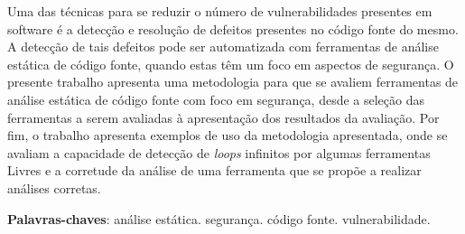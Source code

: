 \begin{resumo}

Uma das técnicas para se reduzir o número de vulnerabilidades presentes em
software é a detecção e resolução de defeitos presentes no código fonte
do mesmo. A detecção de tais defeitos pode ser automatizada com ferramentas de
análise estática de código fonte, quando estas têm um foco em aspectos de
segurança. O presente trabalho apresenta uma metodologia para que se avaliem
ferramentas de análise estática de código fonte com foco em segurança, desde a
seleção das ferramentas a serem avaliadas à apresentação dos resultados da
avaliação. Por fim, o trabalho apresenta exemplos de uso da metodologia
apresentada, onde se avaliam a capacidade de detecção de \textit{loops} 
infinitos por
algumas ferramentas Livres e a corretude da análise de uma ferramenta que se
propõe a realizar análises corretas. 

 \vspace{\onelineskip}
    
 \noindent
 \textbf{Palavras-chaves}: análise estática. segurança. código fonte. vulnerabilidade.
\end{resumo}
